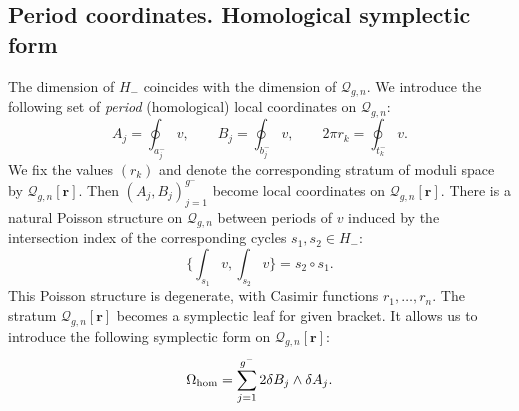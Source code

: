 \documentclass[pdftex]{sigma}
\numberwithin{equation}{section}
\theoremstyle{definition}
\begin{document}
\subsection{Period coordinates. Homological symplectic form}
The dimension of $H_-$ coincides with the dimension of $\mathcal{Q}_{g,n}$. We introduce the following set of \textit{period} (homological) local coordinates on $\mathcal{Q}_{g,n}$:
\begin{equation*}%
A_j=\oint_{a^-_j}v, \qquad B_j=\oint_{b^-_j}v, \qquad 2 \pi r_k= \oint_{t^-_k}v. \end{equation*}
We fix the values $(r_k)$ and denote the corresponding stratum of moduli space by $\mathcal{Q}_{g,n}[\mathbf{r}]$. Then $(A_j, B_j)^{g^-}_{j=1}$ become local coordinates on $\mathcal{Q}_{g,n}[\mathbf{r}].$
There is a natural Poisson structure on $\mathcal{Q}_{g,n}$ between periods of $v$ induced by the intersection index of the corresponding cycles $s_1, s_2 \in H_{-}$:
\begin{equation}\label{41}\bigg\{\int_{s_1}v, \int_{s_2}v \bigg\}= s_2 \circ s_1 .\end{equation}
This Poisson structure is degenerate, with Casimir functions $r_1,\dots,r_n.$ The stratum $\mathcal{Q}_{g,n}[\mathbf{r}]$ becomes a symplectic leaf for given bracket.
It allows us to introduce the following symplectic form on $\mathcal{Q}_{g,n}[\mathbf{r}]$:
\begin{equation*}%
\Omega_{{\rm hom}}=\sum^{g^-}_{j=1}2 \delta B_j \wedge \delta A_j.
\end{equation*}
\end{document}
